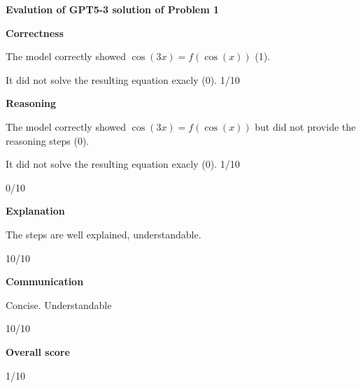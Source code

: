 \documentclass{article}
\begin{document}
{\bf Evalution of GPT5-3 solution of Problem 1}

{\bf Correctness}

The model correctly showed $\cos\left(3x\right)=f\left(\cos\left(x\right)\right)$ (1).

It did not solve the resulting equation exacly (0).
1/10

{\bf Reasoning}

The model correctly showed $\cos\left(3x\right)=f\left(\cos\left(x\right)\right)$ but did not provide the reasoning steps (0).

It did not solve the resulting equation exacly (0).
1/10


0/10

{\bf Explanation}

The steps are well explained, understandable.

10/10

{\bf Communication}

Concise. Understandable

10/10

{\bf Overall score}

1/10
\end{document}
